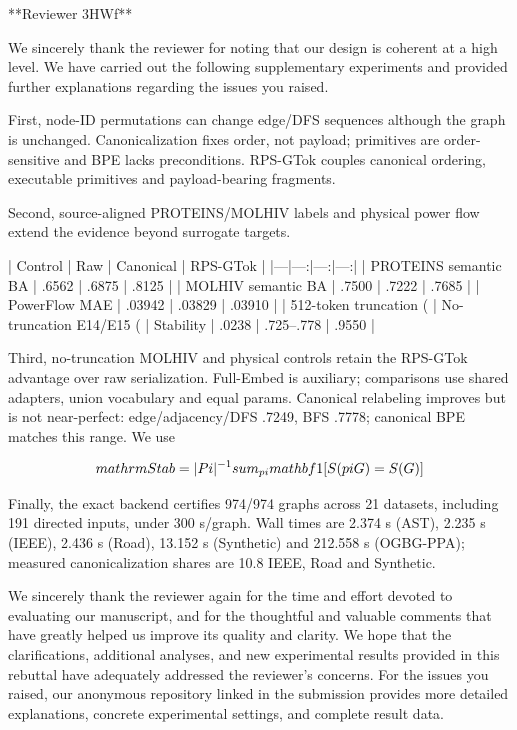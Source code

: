 **Reviewer 3HWf**

We sincerely thank the reviewer for noting that our design is coherent at a
high level. We have carried out the following supplementary experiments and
provided further explanations regarding the issues you raised.

First, node-ID permutations can change edge/DFS sequences although the graph is
unchanged. Canonicalization fixes order, not payload; primitives are
order-sensitive and BPE lacks preconditions. RPS-GTok couples canonical
ordering, executable primitives and payload-bearing fragments.

Second, source-aligned PROTEINS/MOLHIV labels and physical power flow extend the
evidence beyond surrogate targets.

| Control | Raw | Canonical | RPS-GTok |
|---|---:|---:|---:|
| PROTEINS semantic BA | .6562 | .6875 | .8125 |
| MOLHIV semantic BA | .7500 | .7222 | .7685 |
| PowerFlow MAE | .03942 | .03829 | .03910 |
| 512-token truncation (%
| No-truncation E14/E15 (%
| Stability | .0238 | .725--.778 | .9550 |

Third, no-truncation MOLHIV and physical controls retain the RPS-GTok advantage
over raw serialization. Full-Embed is auxiliary; comparisons use shared
adapters, union vocabulary and equal params. Canonical relabeling improves but
is not near-perfect: edge/adjacency/DFS .7249, BFS .7778; canonical BPE matches
this range. We use

$$
\\mathrm{Stab}=|\\Pi|^{-1}\\sum_{\\pi}\\mathbf{1}[S(\\pi G)=S(G)]
$$

Finally, the exact backend certifies 974/974 graphs across 21 datasets,
including 191 directed inputs, under 300 s/graph. Wall times are 2.374 s (AST),
2.235 s (IEEE), 2.436 s (Road), 13.152 s (Synthetic) and 212.558 s (OGBG-PPA);
measured canonicalization shares are 10.8%
IEEE, Road and Synthetic.

We sincerely thank the reviewer again for the time and effort devoted to
evaluating our manuscript, and for the thoughtful and valuable comments that
have greatly helped us improve its quality and clarity. We hope that the
clarifications, additional analyses, and new experimental results provided in
this rebuttal have adequately addressed the reviewer's concerns. For the
issues you raised, our anonymous repository linked in the submission provides
more detailed explanations, concrete experimental settings, and complete
result data.

